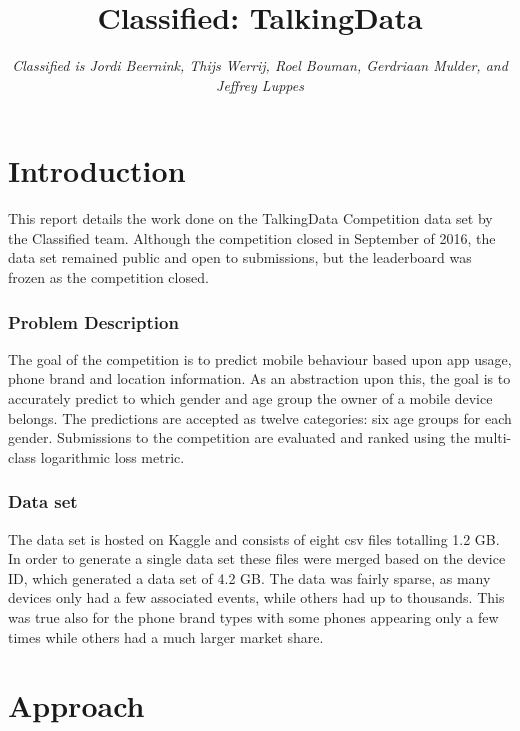 \documentclass[runningheads,a4paper]{llncs}
\begin{document}
\mainmatter 

\title{Classified: TalkingData}


\author{\textit{Classified is Jordi Beernink, Thijs Werrij, Roel Bouman, Gerdriaan Mulder, and Jeffrey Luppes}}



\tocauthor{{}}

\maketitle
\section{Introduction}
\noindent
This report details the work done on the TalkingData Competition data set by the Classified team. Although the competition closed in September of 2016, the data set remained public and open to submissions, but the leaderboard was frozen as the competition closed.

\subsubsection{Problem Description}
The goal of the competition is to predict mobile behaviour based upon app usage, phone brand and location information. As an abstraction upon this, the goal is to accurately predict to which gender and age group the owner of a mobile device belongs. The predictions are accepted as twelve categories: six age groups for each gender. Submissions to the competition are evaluated and ranked using the multi-class logarithmic loss metric.
\subsubsection{Data set}
The data set is hosted on Kaggle and consists of eight csv files totalling 1.2 GB. In order to generate a single data set these files were merged based on the device ID, which generated a data set of 4.2 GB. The data was fairly sparse, as many devices only had a few associated events, while others had up to thousands. This was true also for the phone brand types with some phones appearing only a few times while others had a much larger market share. 

\section{Approach}
\end{document}
